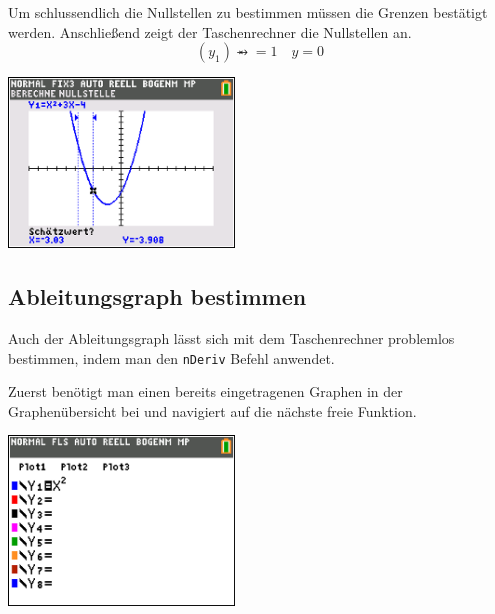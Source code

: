 \begin{paracol}{2}
	\begin{flushleft}
	Um schlussendlich die Nullstellen zu bestimmen müssen die Grenzen bestätigt werden. Anschließend zeigt der Taschenrechner die Nullstellen an.
	\[(y_1)\rightarrowx=1\quad y=0\]
		\end{flushleft}
\switchcolumn
	\begin{flushright}
	\includegraphics[width= 6cm]{Media/GRT/Visualisierung/loesen_gleichung/loesen_gleichung_4.png}
		\end{flushright}
		
\end{paracol}
\pagebreak

\subsection{Ableitungsgraph bestimmen}
Auch der Ableitungsgraph lässt sich mit dem Taschenrechner problemlos bestimmen, indem man den \texttt{nDeriv} Befehl anwendet. 
\begin{paracol}{2}
\begin{flushleft}
	Zuerst benötigt man einen bereits eingetragenen Graphen in der Graphenübersicht bei  und navigiert auf die nächste freie Funktion.
\end{flushleft}
\switchcolumn
\begin{flushright}
\includegraphics[width=6cm]{Media/GRT/Visualisierung/ableitung_bestimmen/ableitung_bestimmen_1.png}
\end{flushright}
\end{paracol}

